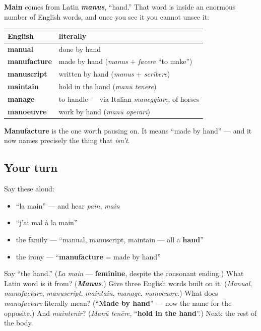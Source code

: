 \begin{cousinweb}
\textbf{Main} comes from Latin \emph{\textbf{manus}}, \textquotedblleft{}hand.\textquotedblright{} That word is inside an enormous number of English words, and once you see it you cannot unsee it:

\noindent
\begin{tabularx}{\linewidth}{@{}>{\raggedright\arraybackslash}X>{\raggedright\arraybackslash}X@{}}
\toprule
\textbf{English} & \textbf{literally} \\
\midrule
\textbf{manual} & done by hand \\
\textbf{manufacture} & made by hand (\emph{manus} + \emph{facere} \textquotedblleft{}to make\textquotedblright{}) \\
\textbf{manuscript} & written by hand (\emph{manus} + \emph{scrībere}) \\
\textbf{maintain} & hold in the hand (\emph{manū tenēre}) \\
\textbf{manage} & to handle — via Italian \emph{maneggiare}, of horses \\
\textbf{manoeuvre} & work by hand (\emph{manū operārī}) \\
\bottomrule
\end{tabularx}

\textbf{Manufacture} is the one worth pausing on. It means \textquotedblleft{}made by hand\textquotedblright{} — and it now names precisely the thing that \emph{isn't}.
\end{cousinweb}

\subsection*{Your turn}
Say these aloud:

\begin{itemize}
\raggedright
  \item \textquotedblleft{}la main\textquotedblright{} — and hear \emph{pain}, \emph{main}
  \item \textquotedblleft{}j'ai mal à la main\textquotedblright{}
  \item the family — \textquotedblleft{}manual, manuscript, maintain — all a \textbf{hand}\textquotedblright{}
  \item the irony — \textquotedblleft{}\textbf{manufacture} = made by hand\textquotedblright{}
\end{itemize}

\begin{tcolorbox}[breakable,colback=teal!4,colframe=teal!35!black,title={Before you move on}]
Say \textquotedblleft{}the hand.\textquotedblright{} (\emph{La main} — \textbf{feminine}, despite the consonant ending.) What Latin word is it from? (\emph{\textbf{Manus}}.) Give three English words built on it. (\emph{Manual}, \emph{manufacture}, \emph{manuscript}, \emph{maintain}, \emph{manage}, \emph{manoeuvre}.) What does \emph{manufacture} literally mean? (\textquotedblleft{}\textbf{Made by hand}\textquotedblright{} — now the name for the opposite.) And \emph{maintenir}? (\emph{Manū tenēre}, \textquotedblleft{}\textbf{hold in the hand}\textquotedblright{}.) Next: the rest of the body.
\end{tcolorbox}
